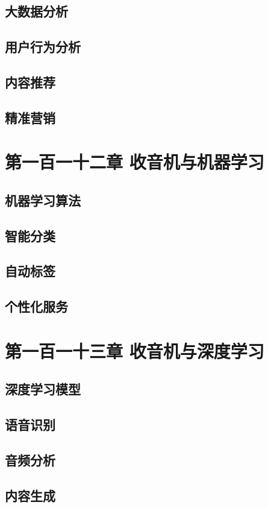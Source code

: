 \documentclass[12pt,UTF8]{ctexbook}
\begin{document}
\section{大数据分析}
\section{用户行为分析}
\section{内容推荐}
\section{精准营销}

\chapter{第一百一十二章 收音机与机器学习}

\section{机器学习算法}
\section{智能分类}
\section{自动标签}
\section{个性化服务}

\chapter{第一百一十三章 收音机与深度学习}

\section{深度学习模型}
\section{语音识别}
\section{音频分析}
\section{内容生成}
\end{document}
